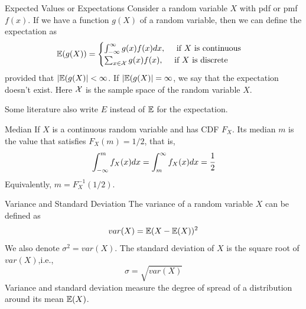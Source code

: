 \documentclass[aspectratio=169,xcolor=dvipsnames,svgnames,x11names,fleqn]{beamer}
\begin{document}
    \begin{frame}{Expected Values or Expectations}
        Consider a random variable $X$ with pdf or pmf $f(x)$.
        If we have a function $g(X)$ of a random variable, then we can define the expectation as 
        \begin{equation}
            {\mathbb E}( g(X)) = \begin{cases}
                \int_{-\infty}^\infty g(x) f(x) dx, \quad \text{~if~} X \text{~is continuous}\\
                \sum_{x\in {\mathcal X}} g(x) f(x), \quad \text{~if~} X \text{~is discrete}
            \end{cases}
        \end{equation}
    provided that $|{\mathbb E}(g(X)| < \infty$. If $|{\mathbb E}(g(X)| = \infty$, we say that the expectation doesn't exist. Here ${\mathcal X}$ is the sample space of the random variable $X$.
    
    Some literature also write $E$ instead of ${\mathbb E}$ for the expectation.
    
    {\color{red}{Expectation is also referred to as mean or average.}}
    \end{frame}
    
    \begin{frame}{Median}
        If $X$ is a continuous random variable and has CDF $F_X$. Its median $m$ is the value that satisfies $F_X(m) = 1/2$, that is,
        \begin{equation}
            \int_{-\infty}^m f_X(x) dx = \int_m^\infty f_X(x)dx = \cfrac{1}{2}
        \end{equation}
        Equivalently, $m = F^{-1}_X (1/2)$.
    \end{frame}
    
    \begin{frame}{Variance and Standard Deviation}
    The variance of a random variable $X$ can be defined as 
    \begin{equation}
        var(X) = {\mathbb E}(X - {\mathbb E}(X))^2
    \end{equation}
    We also denote $\sigma^2 = var(X)$. The standard deviation of $X$ is the square root of $var(X)$,i.e.,
    \begin{equation}
        \sigma = \sqrt{var(X)}
    \end{equation}
    Variance and standard deviation measure the degree of spread of a distribution around its mean ${\mathbb E}(X)$.
    \end{frame}
    
\end{document}
